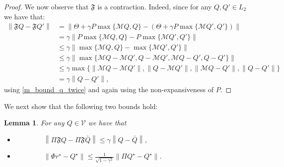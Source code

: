 \documentclass{article}
\newtheorem{lemma}{Lemma}
\begin{document}
\begin{proof}
We now observe that $\mathfrak{F}$ is a contraction. Indeed, since for any $Q,Q'\in L_2$ we have that:
% 
% 
% 
\begin{align*}
\left\|\mathfrak{F}Q-\mathfrak{F}Q'\right\|&=\left\|\Theta+\gamma P \max\{\mathcal{M}Q,Q\}-\left(\Theta+\gamma P \max\{\mathcal{M}Q',Q'\}\right)\right\|
\\&=\gamma \left\|P \max\{\mathcal{M}Q,Q\}-P \max\{\mathcal{M}Q',Q'\}\right\|
\\&\leq\gamma \left\| \max\{\mathcal{M}Q,Q\}- \max\{\mathcal{M}Q',Q'\}\right\|
\\&\leq\gamma \left\| \max\{\mathcal{M}Q-\mathcal{M}Q',Q-\mathcal{M}Q',\mathcal{M}Q-Q',Q-Q'\}\right\|
\\&\leq\gamma \max\{\left\|\mathcal{M}Q-\mathcal{M}Q'\right\|,\left\|Q-\mathcal{M}Q'\right\|,\left\|\mathcal{M}Q-Q'\right\|,\left\|Q-Q'\right\|\}
\\&=\gamma\left\|Q-Q'\right\|,
\end{align*}
using \eqref{m_bound_q_twice} and again using the non-expansiveness of $P$.
\end{proof}
We next show that the following two bounds hold:
\begin{lemma}\label{projection_F_contraction_lemma}
For any $Q\in\mathcal{V}$ we have that
\begin{itemize}
    \item[i)] 
$\qquad\qquad
    \left\|\Pi \mathfrak{F}Q-\Pi \mathfrak{F}\bar{Q}\right\|\leq \gamma\left\|Q-\bar{Q}\right\|$,
    \item[ii)]$\qquad\qquad\left\|\Phi r^\star - Q^\star\right\|\leq \frac{1}{\sqrt{1-\gamma^2}}\left\|\Pi Q^\star - Q^\star\right\|$. 
\end{itemize}
\end{lemma}
\end{document}

